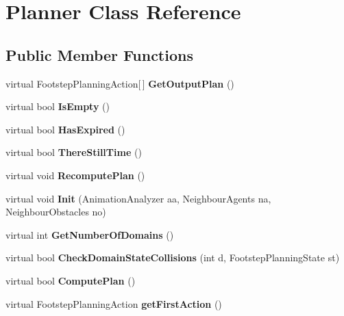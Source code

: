 \hypertarget{class_planner}{\section{Planner Class Reference}
\label{class_planner}
}
\subsection*{Public Member Functions}
\begin{DoxyCompactItemize}
\item 
\hypertarget{class_planner_a547ab7ac5131f9a7b1c21a2c0315a9a5}{virtual Footstep\-Planning\-Action\mbox{[}$\,$\mbox{]} {\bfseries Get\-Output\-Plan} ()}\label{class_planner_a547ab7ac5131f9a7b1c21a2c0315a9a5}

\item 
\hypertarget{class_planner_a524224551fd946ebbdd3ed63fe3a6403}{virtual bool {\bfseries Is\-Empty} ()}\label{class_planner_a524224551fd946ebbdd3ed63fe3a6403}

\item 
\hypertarget{class_planner_a45faf2988ce1bb00355579b2d1db6545}{virtual bool {\bfseries Has\-Expired} ()}\label{class_planner_a45faf2988ce1bb00355579b2d1db6545}

\item 
\hypertarget{class_planner_ad0954ae572578966463be213f396ed78}{virtual bool {\bfseries There\-Still\-Time} ()}\label{class_planner_ad0954ae572578966463be213f396ed78}

\item 
\hypertarget{class_planner_ae9528547234832c67b351e6800b94ff5}{virtual void {\bfseries Recompute\-Plan} ()}\label{class_planner_ae9528547234832c67b351e6800b94ff5}

\item 
\hypertarget{class_planner_a223b6149af3af1f6ba2e61e51e6dda87}{virtual void {\bfseries Init} (Animation\-Analyzer aa, Neighbour\-Agents na, Neighbour\-Obstacles no)}\label{class_planner_a223b6149af3af1f6ba2e61e51e6dda87}

\item 
\hypertarget{class_planner_acbe375938802581e5338e61145711ca0}{virtual int {\bfseries Get\-Number\-Of\-Domains} ()}\label{class_planner_acbe375938802581e5338e61145711ca0}

\item 
\hypertarget{class_planner_ab8dcacec087454aec674af4380286bba}{virtual bool {\bfseries Check\-Domain\-State\-Collisions} (int d, Footstep\-Planning\-State st)}\label{class_planner_ab8dcacec087454aec674af4380286bba}

\item 
\hypertarget{class_planner_a9d3ca9d667c8330d241fcc61d5b2e8f5}{virtual bool {\bfseries Compute\-Plan} ()}\label{class_planner_a9d3ca9d667c8330d241fcc61d5b2e8f5}

\item 
\hypertarget{class_planner_a599560668fe905b64d30794632169945}{virtual Footstep\-Planning\-Action {\bfseries get\-First\-Action} ()}\label{class_planner_a599560668fe905b64d30794632169945}

\end{DoxyCompactItemize}
